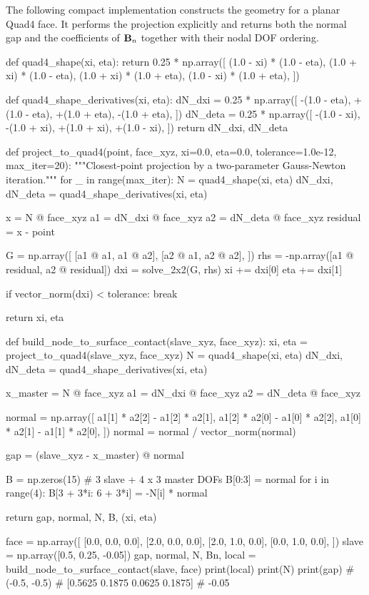 The following compact implementation constructs the geometry for a planar
Quad4 face. It performs the projection explicitly and returns both the normal
gap and the coefficients of $\mathbf{B}_n$ together with their nodal DOF ordering.

\begin{python}
def quad4_shape(xi, eta):
    return 0.25 * np.array([
        (1.0 - xi) * (1.0 - eta),
        (1.0 + xi) * (1.0 - eta),
        (1.0 + xi) * (1.0 + eta),
        (1.0 - xi) * (1.0 + eta),
    ])


def quad4_shape_derivatives(xi, eta):
    dN_dxi = 0.25 * np.array([
        -(1.0 - eta), +(1.0 - eta),
        +(1.0 + eta), -(1.0 + eta),
    ])
    dN_deta = 0.25 * np.array([
        -(1.0 - xi), -(1.0 + xi),
        +(1.0 + xi), +(1.0 - xi),
    ])
    return dN_dxi, dN_deta


def project_to_quad4(point, face_xyz, xi=0.0, eta=0.0,
                     tolerance=1.0e-12, max_iter=20):
    """Closest-point projection by a two-parameter Gauss-Newton iteration."""
    for _ in range(max_iter):
        N = quad4_shape(xi, eta)
        dN_dxi, dN_deta = quad4_shape_derivatives(xi, eta)

        x = N @ face_xyz
        a1 = dN_dxi @ face_xyz
        a2 = dN_deta @ face_xyz
        residual = x - point

        G = np.array([
            [a1 @ a1, a1 @ a2],
            [a2 @ a1, a2 @ a2],
        ])
        rhs = -np.array([a1 @ residual, a2 @ residual])
        dxi = solve_2x2(G, rhs)
        xi += dxi[0]
        eta += dxi[1]

        if vector_norm(dxi) < tolerance:
            break

    return xi, eta


def build_node_to_surface_contact(slave_xyz, face_xyz):
    xi, eta = project_to_quad4(slave_xyz, face_xyz)
    N = quad4_shape(xi, eta)
    dN_dxi, dN_deta = quad4_shape_derivatives(xi, eta)

    x_master = N @ face_xyz
    a1 = dN_dxi @ face_xyz
    a2 = dN_deta @ face_xyz

    normal = np.array([
        a1[1] * a2[2] - a1[2] * a2[1],
        a1[2] * a2[0] - a1[0] * a2[2],
        a1[0] * a2[1] - a1[1] * a2[0],
    ])
    normal = normal / vector_norm(normal)

    gap = (slave_xyz - x_master) @ normal

    B = np.zeros(15)       # 3 slave + 4 x 3 master DOFs
    B[0:3] = normal
    for i in range(4):
        B[3 + 3*i: 6 + 3*i] = -N[i] * normal

    return gap, normal, N, B, (xi, eta)


face = np.array([
    [0.0, 0.0, 0.0],
    [2.0, 0.0, 0.0],
    [2.0, 1.0, 0.0],
    [0.0, 1.0, 0.0],
])
slave = np.array([0.5, 0.25, -0.05])
gap, normal, N, Bn, local = build_node_to_surface_contact(slave, face)
print(local)
print(N)
print(gap)
# (-0.5, -0.5)
# [0.5625 0.1875 0.0625 0.1875]
# -0.05
\end{python}


